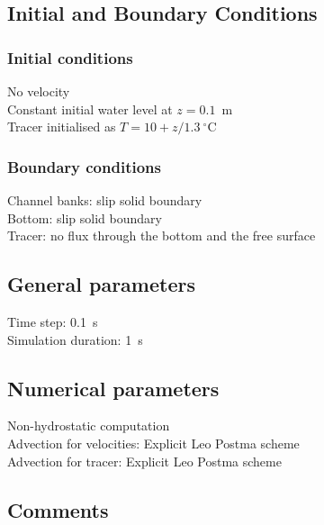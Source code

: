 \subsection{Initial and Boundary Conditions}
%
\subsubsection{Initial conditions}
%
No velocity\\
Constant initial water level at $z = 0.1$~m\\
Tracer initialised as $T = 10 + z/1.3~^\circ$C
%
\subsubsection{Boundary conditions}
%
Channel banks: slip solid boundary\\
Bottom: slip solid boundary\\
Tracer: no flux through the bottom and the free surface
%
\subsection{General parameters}
%
Time step: 0.1~s\\
Simulation duration: 1~s
%
%
%
\subsection{Numerical parameters}
%
Non-hydrostatic computation\\
Advection for velocities: Explicit Leo Postma scheme\\
Advection for tracer: Explicit Leo Postma scheme
%
\subsection{Comments}
%
%
%
